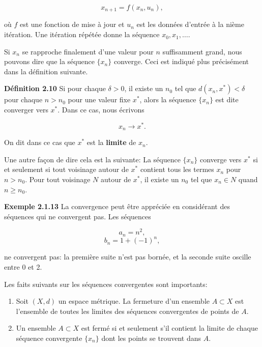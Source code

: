 \documentclass[10pt,twoside,a4paper]{book}
\begin{document}
\begin{equation*}
  x_{n+1} = f(x_n, u_n),
\end{equation*}

\noindent
où $f$ est une fonction de mise à jour et $u_n$ est les données d'entrée à la nième itération. Une itération répétée donne la séquence $x_0, x_1, \ldots$.

Si $x_n$ se rapproche finalement d'une valeur pour $n$ suffisamment grand, nous pouvons dire que la séquence $\{x_n\}$ converge. Ceci est indiqué plus précisément dans la définition suivante.

\vspace{4mm}
\noindent
\textbf{Définition 2.10} Si pour chaque $\delta > 0$, il existe un $n_0$ tel que $d(x_n, x^*) < \delta$ pour chaque $n > n_0$ pour une valeur fixe $x^*$, alors la séquence $\{x_n\}$ est dite converger vers $x^*$. Dans ce cas, nous écrivons

\begin{equation*}
  x_n \longrightarrow x^*.
\end{equation*}

\noindent
On dit dans ce cas que $x^*$ est la \textbf{limite} de $x_n$.

Une autre façon de dire cela est la suivante: La séquence $\{x_n\}$ converge vers $x^*$ si et seulement si tout voisinage autour de $x^*$ contient tous les termes $x_n$ pour $n > n_0$. Pour tout voisinage $N$ autour de $x^*$, il existe un $n_0$ tel que $x_n \in N$ quand $n \geq n_0$.

\vspace{4mm}
\noindent
\textbf{Exemple 2.1.13} La convergence peut être appréciée en considérant des séquences qui ne convergent pas. Les séquences

\begin{equation*}
  a_n = n^2,
\end{equation*}
\begin{equation*}
  b_n = 1 + (-1)^n,
\end{equation*}

\noindent
ne convergent pas: la première suite n'est pas bornée, et la seconde suite oscille entre 0 et 2.

Les faits suivants sur les séquences convergentes sont importants:

\begin{enumerate}
  \item Soit $(X, d)$ un espace métrique. La fermeture d'un ensemble $A \subset X$ est l'ensemble de toutes les limites des séquences convergentes de points de $A$.
  \item Un ensemble $A \subset X$ est fermé si et seulement s'il contient la limite de chaque séquence convergente $\{x_n\}$ dont les points se trouvent dans $A$.
\end{enumerate}
\end{document}
